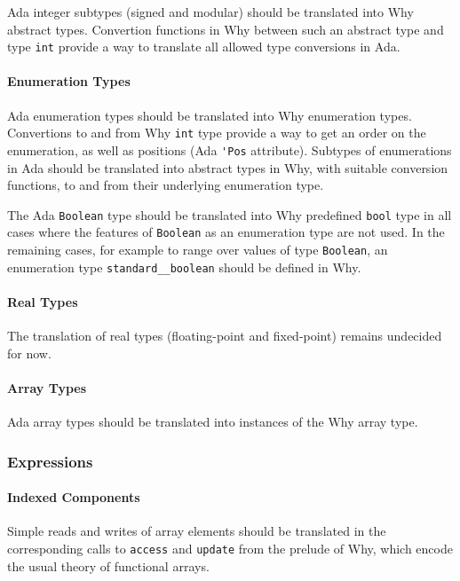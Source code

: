 \documentclass{article}
\newcounter{example}
\begin{document}
Ada integer subtypes (signed and modular) should be translated into Why
abstract types. Convertion functions in Why between such an abstract type and
type \verb|int| provide a way to translate all allowed type conversions in Ada.
 
\paragraph{Enumeration Types}

Ada enumeration types should be translated into Why enumeration
types. Convertions to and from Why \verb|int| type provide a way to get an
order on the enumeration, as well as positions (Ada \verb|'Pos|
attribute). Subtypes of enumerations in Ada should be translated into abstract
types in Why, with suitable conversion functions, to and from their underlying
enumeration type.

The Ada \verb|Boolean| type should be translated into Why predefined
\verb|bool| type in all cases where the features of \verb|Boolean| as an
enumeration type are not used. In the remaining cases, for example to range
over values of type \verb|Boolean|, an enumeration type
\verb|standard__boolean| should be defined in Why.

\paragraph{Real Types}

The translation of real types (floating-point and fixed-point) remains
undecided for now.

\paragraph{Array Types}

Ada array types should be translated into instances of the Why array type. 

\subsubsection{Expressions}

\paragraph{Indexed Components} 

Simple reads and writes of array elements should be translated in the
corresponding calls to \verb|access| and \verb|update| from the prelude of Why,
which encode the usual theory of functional arrays.
\end{document}
